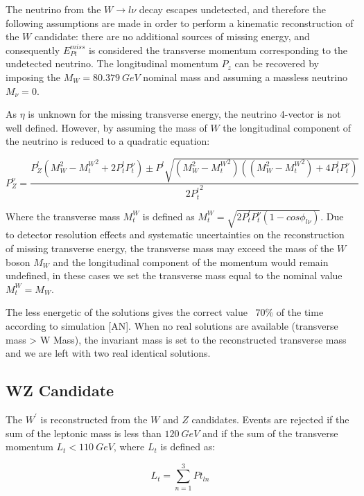 The neutrino from the $W \rightarrow l\nu$ decay escapes undetected,
and therefore the following assumptions are made in order to perform a kinematic
reconstruction of the $W$ candidate: there are no additional sources of missing
energy, and consequently $E_{Pt}^{miss}$ is considered the transverse momentum
corresponding to the undetected neutrino. The longitudinal momentum $P_z$ can be
recovered by imposing the $M_W=80.379~GeV $ nominal mass and assuming
a massless neutrino $M_\nu = 0.$

As $\eta$ is unknown for the missing transverse energy, the neutrino 4-vector is
not well defined. However, by assuming the mass of $W$ the longitudinal component
of the neutrino is reduced to a quadratic equation:

\[
P_{Z}^{\nu} = \frac{P_{Z}^{l}({M_{W}^{2}-{M_{t}^{W}}^2+2P_{t}^{l}{P_{t}^{\nu}}}) \pm P^{l}\sqrt{(M_{W}^{2}-{M_{t}^{W}}^2)((M_{W}^{2}-{M_{t}^{W}}^2)+4P_{t}^{l}P_{t}^{\nu})}}{{2P_{t}^{l}}^{2}}
\]

Where the transverse mass $M_{t}^{W}$ is defined
as ${M_{t}^{W}}=\sqrt{2P_{t}^{l}P_{t}^{\nu}(1-cos\phi_{l\nu})}$.
Due to detector resolution effects and systematic uncertainties on the
reconstruction of missing transverse energy, the transverse mass may
exceed the mass of the $W$ boson $M_W$ and the
longitudinal component of the momentum would remain undefined, in these cases
we set the transverse mass equal to the nominal value $M_{t}^{W}=M_W$.

The less energetic of the solutions gives the correct value ~70\% of the time
according to simulation [AN].
When no real solutions are available (transverse mass > W Mass), the invariant
mass is set to the reconstructed transverse mass and we are left with two real
identical solutions.


\subsection{WZ Candidate}

The $W^{\prime}$ is reconstructed from the $W$ and $Z$ candidates.
Events are rejected if the sum of the leptonic mass is less than $120~GeV$ and
if the sum of the transverse momentum $L_{t}<110~GeV$, where $L_{t}$ is defined
as:

\[
L_{t} = \sum_{n=1}^{3} Pt_{ln}
\]






